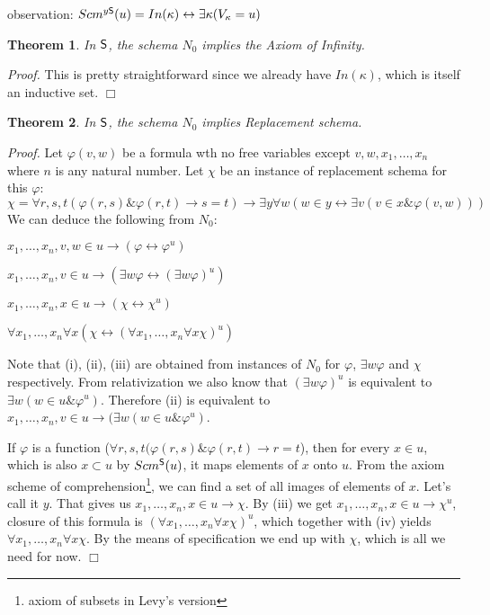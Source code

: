 \documentclass[12pt,a4paper]{article}
\newtheorem{theorem}{Theorem}[section]
\newenvironment{proof}
{\noindent \textit{Proof.}}
{\hspace*{\fill} $\Box$}
\renewcommand{\iff}{\leftrightarrow}
\newcommand{\then}{\rightarrow}
\newcommand{\bce}{\begin{compactenum}}
\newcommand{\ece}{\end{compactenum}}
\begin{document}
observation: $Scm^{y\sf{S}}(u) = In(\kappa) \iff \exists \kappa (V_\kappa = u)$

\begin{theorem}
In $\sf{S}$, the schema $N_0$ implies the Axiom of Infinity.
\end{theorem}

\begin{proof}
This is pretty straightforward since we already have $In(\kappa)$, which is itself an inductive set. %
\end{proof}


\begin{theorem}
In $\sf{S}$, the schema $N_0$ implies Replacement schema.
\end{theorem}

\begin{proof}
Let $\varphi(v, w)$ be a formula wth no free variables except $v, w, x_1, \ldots, x_n$ where $n$ is any natural number.
Let $\chi$ be an instance of replacement schema for this $\varphi$:
\begin{equation}
\chi = \forall r, s, t(\varphi(r, s) \& \varphi(r, t) \then s = t) \then \exists y \forall w (w \in y \iff \exists v (v \in x \& \varphi(v, w)))
\end{equation}
\medskip
We can deduce the following from $N_0$: 
\bce[(i)]
\item $x_1, \ldots, x_n, v, w \in u \then (\varphi \iff \varphi^{u}) $
\item $x_1, \ldots, x_n, v \in u \then (\exists w \varphi \iff (\exists w \varphi)^{u})$
\item $x_1, \ldots, x_n, x \in u \then (\chi \iff \chi^{u})$
\item $\forall x_1, \ldots, x_n \forall x (\chi \iff (\forall x_1, \ldots, x_n \forall x \chi)^{u})$
\ece

Note that (i), (ii), (iii) are obtained from instances of $N_0$ for $\varphi$, $\exists w \varphi$ and $\chi$ respectively.  %
From relativization we also know that $(\exists w \varphi)^{u}$ is equivalent to $\exists w (w \in u \& \varphi^{u})$.
Therefore (ii) is equivalent to $x_1, \ldots, x_n, v \in u \then (\exists w (w \in u \& \varphi^{u})$. 

If $\varphi$ is a function ($ \forall r, s, t(\varphi(r, s) \& \varphi(r, t) \then r=t $), then for every $x \in u$, which is also $x \subset u$ by $Scm^{\sf{S}}(u)$,
it maps elements of $x$ onto $u$. From the axiom scheme of comprehension\footnote{axiom of subsets in Levy's version}, we can find a set of all images of elements of $x$. Let's call it $y$.
That gives us $x_1, \ldots, x_n, x \in u \then \chi$. By (iii) we get $x_1, \ldots, x_n, x \in u \then \chi^{u}$, closure of this formula is $(\forall x_1, \ldots, x_n \forall x \chi)^{u}$, 
which together with (iv) yields $\forall x_1, \ldots, x_n \forall x \chi$. By the means of specification we end up with $\chi$, which is all we need for now. 
\end{proof}
\end{document}
